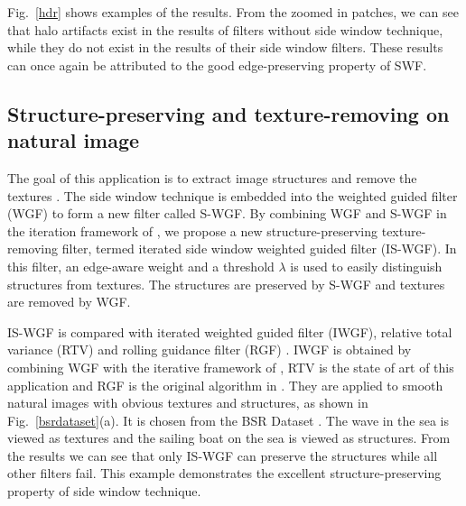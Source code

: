 \documentclass[10pt,twocolumn,letterpaper]{article}
\begin{document}
Fig.~\ref{hdr} shows examples of the results. From the zoomed in patches, we can see that halo artifacts exist in the results of filters without side window technique, while they do not exist in the results of their side window filters. These results can once again be attributed to the good edge-preserving property of SWF.
\subsection{Structure-preserving and texture-removing on natural image}
The goal of this application is to extract image structures and remove the textures \cite{rtv}. The side window technique is embedded into the weighted guided filter (WGF) \cite{wgf} to form a new filter called S-WGF. By combining WGF and S-WGF in the iteration framework of \cite{rgf}, we propose a new structure-preserving texture-removing filter, termed iterated side window weighted guided filter (IS-WGF). In this filter, an edge-aware weight \cite{wgf} and a threshold $\lambda$ is used to easily distinguish structures from textures. The structures are preserved by S-WGF and textures are removed by WGF. 

IS-WGF is compared with iterated weighted guided filter (IWGF), relative total variance (RTV) \cite{rtv} and rolling guidance filter (RGF) \cite{rgf}. IWGF is obtained by combining WGF with the iterative framework of \cite{rgf}, RTV is the state of art of this application and RGF is the original algorithm in \cite{rgf}. They are applied to smooth natural images with obvious textures and structures, as shown in Fig.~\ref{bsrdataset}(a). It is chosen from the BSR Dataset \cite{bsr}. The wave in the sea is viewed as textures and the sailing boat on the sea is viewed as structures. From the results we can see that only IS-WGF can preserve the structures while all other filters fail. This example demonstrates the excellent structure-preserving property of side window technique.
\end{document}
